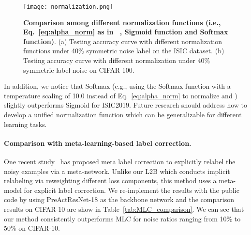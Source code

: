 \documentclass{article}
\begin{document}
\begin{figure}[h]
\centering
        \texttt{[image: normalization.png]}
        \vspace{-3em}
        \caption{\textbf{Comparison among different normalization functions (i.e., Eq.~\eqref{eq:alpha_norm} as in ~\cite{ren2018learning}, Sigmoid function and Softmax function)}. (a) Testing accuracy curve with different normalization functions under 40\% symmetric noise label on the ISIC dataset. (b) Testing accuracy curve with different normalization under 40\% symmetric label noise on CIFAR-100.}
        \label{fig:normalization_comparison}
\end{figure}


In addition, we notice that Softmax (e.g., using the Softmax function with a temperature scaling of 10.0 instead of Eq.~\eqref{eq:alpha_norm} to normalize  and ) slightly outperforms Sigmoid for ISIC2019. Future research should address how to develop a unified normalization function which can be generalizable for different learning tasks.


\paragraph{Comparison with meta-learning-based label correction.}
One recent study~\cite{zheng2021meta} has proposed meta label correction to explicitly relabel the noisy examples via a meta-network. Unlike our L2B which conducts implicit relabeling via reweighting different loss components, this method uses a meta-model for explicit label correction. We re-implement the results with the public code by using PreActResNet-18 as the backbone network
and the comparison results on CIFAR-10 are show in Table~\ref{tab:MLC_comparison}. 
We can see that our method consistently outperforms MLC for noise ratios ranging from 10\% to 50\% on CIFAR-10.

\begin{table}[h!]
\footnotesize
\centering
\caption{Comparison with MLC ~\cite{zheng2021meta} in test accuracy (\%) on CIFAR-10 with symmetric noise.}
\vspace{-1em}
\label{tab:MLC_comparison}
\vspace{-1em}
\end{table} 
\end{document}
